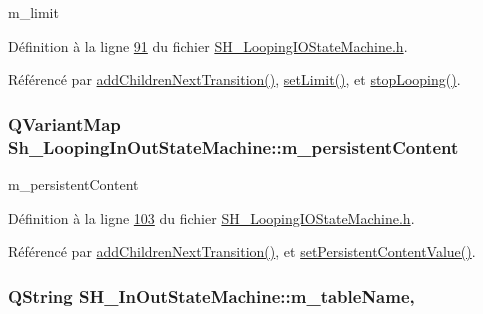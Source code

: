 m\-\_\-limit 



Définition à la ligne \hyperlink{SH__LoopingIOStateMachine_8h_source_l00091}{91} du fichier \hyperlink{SH__LoopingIOStateMachine_8h_source}{S\-H\-\_\-\-Looping\-I\-O\-State\-Machine.\-h}.



Référencé par \hyperlink{classSh__LoopingInOutStateMachine_a20d5e4d9feea63bea747b45b7c10ca01}{add\-Children\-Next\-Transition()}, \hyperlink{classSh__LoopingInOutStateMachine_a34e317bd7e5aa9fed88fb6df90c85f16}{set\-Limit()}, et \hyperlink{classSh__LoopingInOutStateMachine_a2ddae49a46de3794fd934f830d2388f8}{stop\-Looping()}.

\hypertarget{classSh__LoopingInOutStateMachine_ad9c0db5b057a6ba340ffcaddce60d6da}{
\subsubsection[{m\-\_\-persistent\-Content}]{\setlength{\rightskip}{0pt plus 5cm}Q\-Variant\-Map Sh\-\_\-\-Looping\-In\-Out\-State\-Machine\-::m\-\_\-persistent\-Content\hspace{0.3cm}{\ttfamily [private]}}}\label{classSh__LoopingInOutStateMachine_ad9c0db5b057a6ba340ffcaddce60d6da}


m\-\_\-persistent\-Content 



Définition à la ligne \hyperlink{SH__LoopingIOStateMachine_8h_source_l00103}{103} du fichier \hyperlink{SH__LoopingIOStateMachine_8h_source}{S\-H\-\_\-\-Looping\-I\-O\-State\-Machine.\-h}.



Référencé par \hyperlink{classSh__LoopingInOutStateMachine_a20d5e4d9feea63bea747b45b7c10ca01}{add\-Children\-Next\-Transition()}, et \hyperlink{classSh__LoopingInOutStateMachine_a087727c67edb0961797c35d613003bfa}{set\-Persistent\-Content\-Value()}.

\hypertarget{classSH__InOutStateMachine_acc0f5d5133af2dcca30939f53ec8837b}{
\subsubsection[{m\-\_\-table\-Name}]{\setlength{\rightskip}{0pt plus 5cm}Q\-String S\-H\-\_\-\-In\-Out\-State\-Machine\-::m\-\_\-table\-Name\hspace{0.3cm}{\ttfamily [protected]}, {\ttfamily [inherited]}}}\label{classSH__InOutStateMachine_acc0f5d5133af2dcca30939f53ec8837b}


